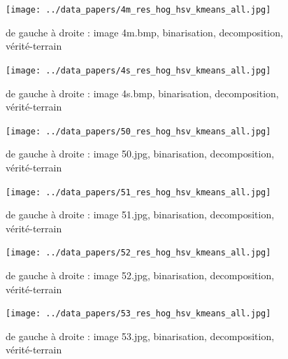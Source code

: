 \documentclass{book}
\begin{document}
\begin{figure}[H]
\begin{center}
\texttt{[image: ../data\_papers/4m\_res\_hog\_hsv\_kmeans\_all.jpg]}
\end{center}
\caption{de gauche à droite : image 4m.bmp, binarisation, decomposition, vérité-terrain}
\label{4m}
\end{figure}
\clearpage


\begin{figure}[H]
\begin{center}
\texttt{[image: ../data\_papers/4s\_res\_hog\_hsv\_kmeans\_all.jpg]}
\end{center}
\caption{de gauche à droite : image 4s.bmp, binarisation, decomposition, vérité-terrain}
\label{4s}
\end{figure}
\clearpage


\begin{figure}[H]
\begin{center}
\texttt{[image: ../data\_papers/50\_res\_hog\_hsv\_kmeans\_all.jpg]}
\end{center}
\caption{de gauche à droite : image 50.jpg, binarisation, decomposition, vérité-terrain}
\label{50}
\end{figure}
\clearpage


\begin{figure}[H]
\begin{center}
\texttt{[image: ../data\_papers/51\_res\_hog\_hsv\_kmeans\_all.jpg]}
\end{center}
\caption{de gauche à droite : image 51.jpg, binarisation, decomposition, vérité-terrain}
\label{51}
\end{figure}
\clearpage


\begin{figure}[H]
\begin{center}
\texttt{[image: ../data\_papers/52\_res\_hog\_hsv\_kmeans\_all.jpg]}
\end{center}
\caption{de gauche à droite : image 52.jpg, binarisation, decomposition, vérité-terrain}
\label{52}
\end{figure}
\clearpage


\begin{figure}[H]
\begin{center}
\texttt{[image: ../data\_papers/53\_res\_hog\_hsv\_kmeans\_all.jpg]}
\end{center}
\caption{de gauche à droite : image 53.jpg, binarisation, decomposition, vérité-terrain}
\label{53}
\end{figure}
\clearpage
\end{document}
